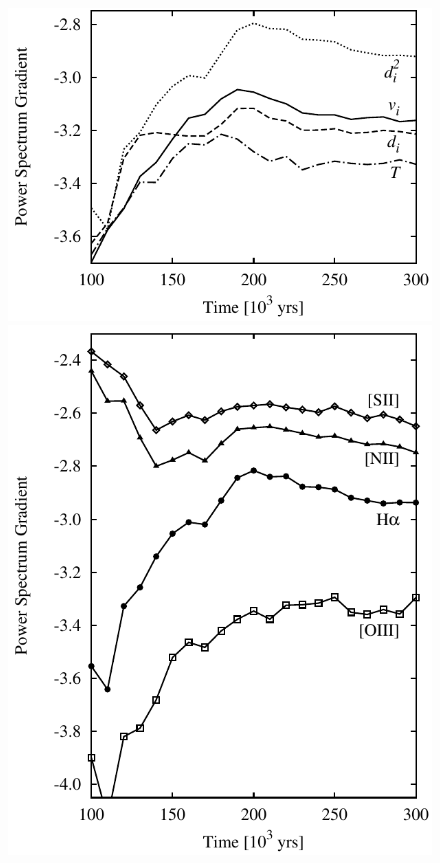 \documentclass[useAMS,usenatbib]{mn2e}
\providecommand{\DIFaddbeginFL}{} %
\providecommand{\DIFdelbeginFL}{} %
\providecommand{\DIFdelendFL}{} %
\begin{document}
\begin{figure}
\centering
\DIFdelbeginFL %
\DIFdelendFL \DIFaddbeginFL \includegraphics[width=\linewidth]{afkz1}\\
\includegraphics[width=\linewidth]{ef1kmp}

\end{figure}
\end{document}
